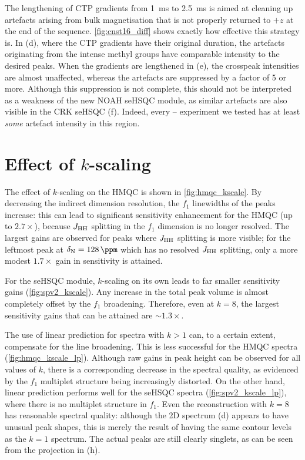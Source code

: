 The lengthening of CTP gradients from \SI{1}{\ms} to \SI{2.5}{\ms} is aimed at cleaning up artefacts arising from bulk magnetisation that is not properly returned to $+z$ at the end of the sequence.
\cref{fig:cnst16_diff} shows exactly how effective this strategy is.
In (d), where the CTP gradients have their original duration, the artefacts originating from the intense methyl groups have comparable intensity to the desired peaks.
When the gradients are lengthened in (e), the crosspeak intensities are almost unaffected, whereas the artefacts are suppressed by a factor of 5 or more.
Although this suppression is not complete, this should not be interpreted as a weakness of the new NOAH seHSQC module, as similar artefacts are also visible in the CRK seHSQC (f).
Indeed, every \nitrogen{}--\proton{} experiment we tested has at least \textit{some} artefact intensity in this region.

\section{Effect of \texorpdfstring{$k$}{k}-scaling}

The effect of $k$-scaling on the HMQC is shown in \cref{fig:hmqc_kscale}.
By decreasing the indirect dimension resolution, the $f_1$ linewidths of the peaks increase: this can lead to significant sensitivity enhancement for the HMQC (up to $2.7 \times$), because $\jhh$ splitting in the $f_1$ dimension is no longer resolved.
The largest gains are observed for peaks where $\jhh$ splitting is more visible; for the leftmost peak at $\delta_{\ce{N}} = \SI{128}{\ppm}$ which has no resolved $\jhh$ splitting, only a more modest $1.7 \times$ gain in sensitivity is attained.

For the seHSQC module, $k$-scaling on its own leads to far smaller sensitivity gains (\cref{fig:spv2_kscale}).
Any increase in the total peak volume is almost completely offset by the $f_1$ broadening.
Therefore, even at $k = 8$, the largest sensitivity gains that can be attained are $\sim 1.3\times$.

The use of linear prediction for spectra with $k > 1$ can, to a certain extent, compensate for the line broadening.
This is less successful for the HMQC spectra (\cref{fig:hmqc_kscale_lp}).
Although raw gains in peak height can be observed for all values of $k$, there is a corresponding decrease in the spectral quality, as evidenced by the $f_1$ multiplet structure being increasingly distorted.
On the other hand, linear prediction performs well for the seHSQC spectra (\cref{fig:spv2_kscale_lp}), where there is no multiplet structure in $f_1$.
Even the reconstruction with $k = 8$ has reasonable spectral quality: although the 2D spectrum (d) appears to have unusual peak shapes, this is merely the result of having the same contour levels as the $k = 1$ spectrum.
The actual peaks are still clearly singlets, as can be seen from the projection in (h).

